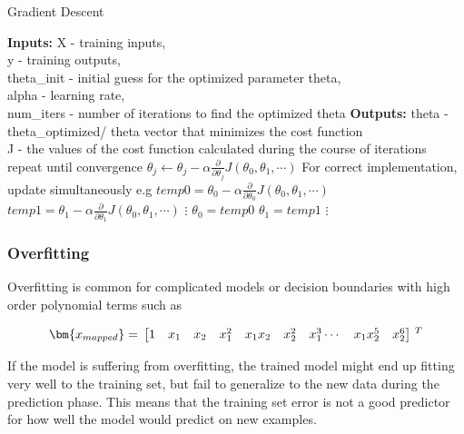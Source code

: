  \begin{algorithm}
   \caption{Gradient Descent}
    \begin{algorithmic}[1]
           \State \textbf{Inputs:} X - training inputs, \\
           \qquad \qquad y - training outputs, \\
           \qquad \qquad theta\_init - initial guess for the optimized parameter theta,\\ 
           \qquad \qquad alpha - learning rate, \\
           \qquad \qquad num\_iters - number of iterations to find the optimized theta
           \State \textbf{Outputs:} theta - theta\_optimized/ theta vector that minimizes the cost function \\
           \qquad \qquad J - the values of the cost function calculated during the course of iterations
    \State repeat until convergence {
    \State $\theta_j \leftarrow \theta_j - \alpha \frac{\partial}{\partial \theta_j}J(\theta_0, \theta_1, \cdots)$
    	 \State For correct implementation, update simultaneously e.g
	 \State 	\qquad  $temp0 = \theta_0 - \alpha \frac{\partial}{\partial \theta_0}J(\theta_0, \theta_1, \cdots)$
	 \State 	\qquad  $temp1 = \theta_1 - \alpha \frac{\partial}{\partial \theta_1}J(\theta_0, \theta_1, \cdots)$
          \State 	\qquad  \qquad $\vdots$
          \State 	\qquad  $\theta_0 = temp0$
	 \State 	\qquad  $\theta_1 = temp1$
	 \State 	\qquad  \qquad $\vdots$
		 }
       \EndFunction
\end{algorithmic}
\end{algorithm}

\fi

\subsubsection{Overfitting}

Overfitting is common for complicated models or decision boundaries with high order polynomial terms such as

\begin{equation}{\label{eqn:featureMapping2}}
\bm{x_{mapped}}
=\,
\begin{bmatrix}
1 & x_1 & x_2 & x_1^2 & x_1x_2 & x_2^2 & x_1^3 \cdots & x_1x_2^5 & x_2^6 
\end{bmatrix}
\,^ T
\end{equation} 

If the model is suffering from overfitting, the trained model might end up fitting very well to the training set, but fail to generalize to the new data during the prediction phase. 
This means that the training set error is not a good predictor for how well the model would predict on new examples.

